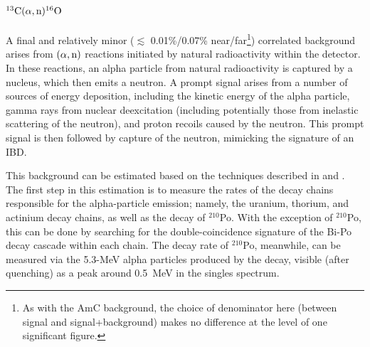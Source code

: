 \documentclass[../thesis.tex]{subfiles}
\begin{document}
\begin{table}[ht]
  \caption{AmC background rates for the P17B data set \cite{lianghongBkg}.}
  \label{tab:bkgAmcDailyRates}
\end{table}


\section{$^{13}\mathrm{C}(\alpha, \mathrm{n})^{16}\mathrm{O}$}
\label{sec:bkgCanOOverview}

A final and relatively minor ($\lesssim$ 0.01\%/0.07\% near/far\footnote{As with the AmC background, the choice of denominator here (between signal and signal+background) makes no difference at the level of one significant figure.}) correlated background arises from $(\alpha,\mathrm{n})$ reactions initiated by natural radioactivity within the detector. In these reactions, an alpha particle from natural radioactivity is captured by a nucleus, which then emits a neutron. A prompt signal arises from a number of sources of energy deposition, including the kinetic energy of the alpha particle, gamma rays from nuclear deexcitation (including potentially those from inelastic scattering of the neutron), and proton recoils caused by the neutron. This prompt signal is then followed by capture of the neutron, mimicking the signature of an IBD.

This background can be estimated based on the techniques described in \cite{Zhao_2014} and \cite{An_2017}. The first step in this estimation is to measure the rates of the decay chains responsible for the alpha-particle emission; namely, the uranium, thorium, and actinium decay chains, as well as the decay of $^{210}$Po. With the exception of $^{210}$Po, this can be done by searching for the double-coincidence signature of the Bi-Po decay cascade within each chain. The decay rate of $^{210}$Po, meanwhile, can be measured via the 5.3-MeV alpha particles produced by the decay, visible (after quenching) as a peak around 0.5~MeV in the singles spectrum.
\end{document}
